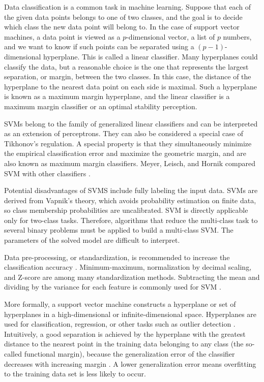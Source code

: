 \documentclass[preprint,12pt]{elsarticle}
\begin{document}
Data classification is a common task in machine learning. Suppose that each of the given data points belongs to one of two classes, and the goal is to decide which class the new data point will belong to. In the case of support vector machines, a data point is viewed as a $p$-dimensional vector, a list of $p$ numbers, and we want to know if such points can be separated using a $(p-1)$-dimensional hyperplane. This is called a linear classifier. Many hyperplanes could classify the data, but a reasonable choice is the one that represents the largest separation, or margin, between the two classes. In this case, the distance of the hyperplane to the nearest data point on each side is maximal. Such a hyperplane is known as a maximum margin hyperplane, and the linear classifier is a maximum margin classifier or an optimal stability perception.

SVMs belong to the family of generalized linear classifiers and can be interpreted as an extension of perceptrons. They can also be considered a special case of Tikhonov's regulation. A special property is that they simultaneously minimize the empirical classification error and maximize the geometric margin, and are also known as maximum margin classifiers. Meyer, Leisch, and Hornik compared SVM with other classifiers \cite{Meyer2003}.

Potential disadvantages of SVMS include fully labeling the input data. SVMs are derived from Vapnik's theory, which avoids probability estimation on finite data, so class membership probabilities are uncalibrated. SVM is directly applicable only for two-class tasks. Therefore, algorithms that reduce the multi-class task to several binary problems must be applied to build a multi-class SVM. The parameters of the solved model are difficult to interpret.

Data pre-processing, or standardization, is recommended to increase the classification accuracy \cite{Fan2008}. Minimum-maximum, normalization by decimal scaling, and Z-score \cite{Mohamad2013} are among many standardization methods. Subtracting the mean and dividing by the variance for each feature is commonly used for SVM \cite{Fennell2019}.

More formally, a support vector machine constructs a hyperplane or set of hyperplanes in a high-dimensional or infinite-dimensional space. Hyperplanes are used for classification, regression, or other tasks such as outlier detection \cite{developers2023}. Intuitively, a good separation is achieved by the hyperplane with the greatest distance to the nearest point in the training data belonging to any class (the so-called functional margin), because the generalization error of the classifier decreases with increasing margin \cite{Hastie2009}. A lower generalization error means overfitting to the training data set is less likely to occur.
\end{document}
